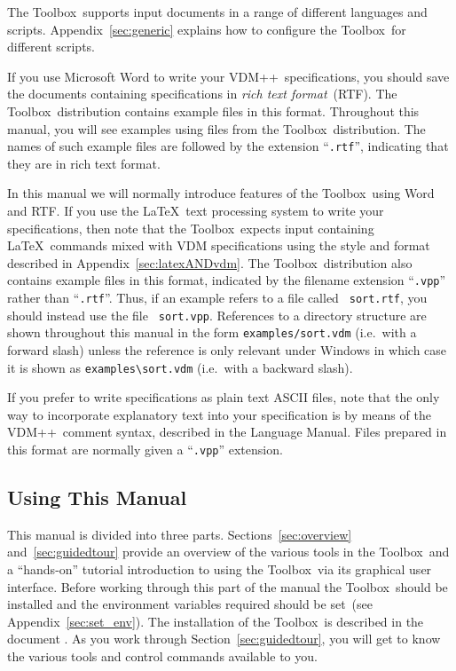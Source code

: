 \documentclass[\pformat,12pt]{article}
\newcommand{\vdmslpp}{VDM++}
\newcommand{\Toolbox}{Toolbox}
\newcommand{\vdmext}{vpp}
\begin{document}
The \Toolbox\ supports input documents in a range of different
languages and scripts. 
Appendix~\ref{sec:generic} explains how to 
configure the \Toolbox\ for different scripts. 

If you use Microsoft Word to write your \vdmslpp\ specifications, you
should save the documents containing specifications in {\em rich text
  format\/}~(RTF). The \Toolbox\ distribution contains example files in
this format. Throughout this manual, you will see examples using files
from the \Toolbox\ distribution. The names of such example files are
followed by the extension ``{\tt .rtf}'', indicating that they are in
rich text format. 

In this manual we will normally introduce features of the \Toolbox\ 
using Word and RTF.  If you use the \LaTeX\ text processing system to
write your specifications, then note that the \Toolbox\ expects input
containing \LaTeX\ commands mixed with VDM specifications using the
style and format described in Appendix~\ref{sec:latexANDvdm}. The
\Toolbox\ distribution also contains example files in this format,
indicated by the filename extension ``{\tt .\vdmext}'' rather than
``{\tt .rtf}''.  Thus, if an example refers to a file called {\tt
  sort.rtf}, you should instead use the file {\tt
  sort.\vdmext}. References to a directory structure are shown
throughout this manual in the form {\tt examples/sort.vdm} (i.e.\ with a
forward slash)   unless the reference is only relevant under Windows
in which case  it is shown as \verb+examples\sort.vdm+ (i.e.\ with a
backward slash).

If you prefer to write specifications as plain text ASCII files, 
note that the only way to incorporate explanatory text into your
specification is by means of the \vdmslpp\ comment syntax, described
in the Language Manual. Files prepared in this format are normally
given a ``{\tt .\vdmext}'' extension.


\subsection*{Using This Manual}

This manual is divided into three parts. Sections~\ref{sec:overview}
and~\ref{sec:guidedtour} provide an overview of the various tools in
the \Toolbox\ and a ``hands-on'' tutorial introduction to using the
\Toolbox\ via its graphical user interface.  Before working through
this part of the manual the \Toolbox\ should be installed and the
environment variables required should be set~(see
Appendix~\ref{sec:set_env}). The installation of the \Toolbox\ is
described in the document
.
As you work through Section~\ref{sec:guidedtour}, you will get to know
the various tools and control commands available to you.
\end{document}
